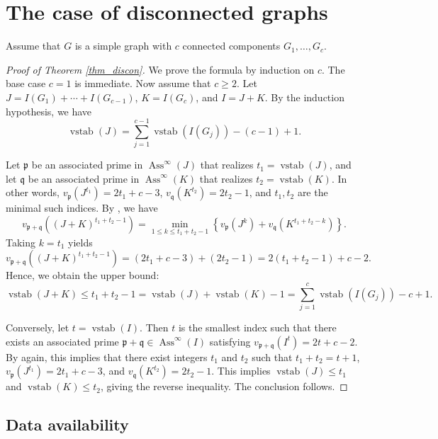 \documentclass[12pt,reqno,twoside]{amsart}
\theoremstyle{definition}
\theoremstyle{plain}
\theoremstyle{remark}
\numberwithin{equation}{section}
\begin{document}
\section{The case of disconnected graphs}\label{sec_discon}
Assume that $G$ is a simple graph with $c$ connected components $G_1, \ldots, G_c$. 

\begin{proof}[Proof of Theorem \ref{thm_discon}] 
We prove the formula by induction on $c$. The base case $c = 1$ is immediate. Now assume that $c \ge 2$. Let $J = I(G_1) + \cdots + I(G_{c-1})$, $K = I(G_c)$, and $I = J + K$. By the induction hypothesis, we have 
\[
\operatorname{vstab}(J) = \sum_{j=1}^{c-1} \operatorname{vstab}(I(G_j)) - (c-1) + 1.
\]

Let $\mathfrak{p}$ be an associated prime in $\operatorname{Ass}^\infty(J)$ that realizes $t_1 = \operatorname{vstab}(J)$, and let $\mathfrak{q}$ be an associated prime in $\operatorname{Ass}^\infty(K)$ that realizes $t_2 = \operatorname{vstab}(K)$. In other words, $v_{\mathfrak{p}}(J^{t_1}) = 2t_1 + c - 3$, $v_{\mathfrak{q}}(K^{t_2}) = 2t_2 - 1$, and $t_1, t_2$ are the minimal such indices. By \cite[Theorem 4.1]{FM}, we have
\[
v_{\mathfrak{p}+\mathfrak{q}}((J + K)^{t_1 + t_2 - 1}) = \min_{1 \le k \le t_1 + t_2 - 1} \left\{ v_{\mathfrak{p}}(J^k) + v_{\mathfrak{q}}(K^{t_1 + t_2 - k}) \right\}.
\]
Taking $k = t_1$ yields
\[
v_{\mathfrak{p}+\mathfrak{q}}((J + K)^{t_1 + t_2 - 1}) = (2t_1 + c - 3) + (2t_2 - 1) = 2(t_1 + t_2 - 1) + c - 2.
\]
Hence, we obtain the upper bound:
\[
\operatorname{vstab}(J + K) \le t_1 + t_2 - 1 = \operatorname{vstab}(J) + \operatorname{vstab}(K) - 1 = \sum_{j=1}^c \operatorname{vstab}(I(G_j)) - c + 1.
\]

Conversely, let $t = \operatorname{vstab}(I)$. Then $t$ is the smallest index such that there exists an associated prime $\mathfrak{p} + \mathfrak{q} \in \operatorname{Ass}^\infty(I)$ satisfying $v_{\mathfrak{p}+\mathfrak{q}}(I^t) = 2t + c - 2$. By \cite[Theorem 4.1]{FM} again, this implies that there exist integers $t_1$ and $t_2$ such that $t_1 + t_2 = t + 1$, $v_{\mathfrak{p}}(J^{t_1}) = 2t_1 + c - 3$, and $v_{\mathfrak{q}}(K^{t_2}) = 2t_2 - 1$. This implies $\operatorname{vstab}(J) \le t_1$ and $\operatorname{vstab}(K) \le t_2$, giving the reverse inequality. The conclusion follows.
\end{proof}

\vspace{1mm}
\subsection*{Data availability}
\end{document}
